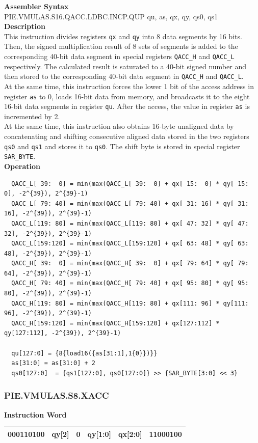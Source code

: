 \textbf{Assembler Syntax} \\
PIE.VMULAS.S16.QACC.LDBC.INCP.QUP qu, as, qx, qy, qs0, qs1 \\
\textbf{Description} \\
This instruction divides registers \lstinline{qx} and \lstinline{qy} into 8 data segments by 16 bits. Then, the signed multiplication result of 8 sets of segments is added to the corresponding 40-bit data segment in special registers \lstinline{QACC_H} and \lstinline{QACC_L} respectively. The calculated result is saturated to a 40-bit signed number and then stored to the corresponding 40-bit data segment in \lstinline{QACC_H} and \lstinline{QACC_L}.\\
At the same time, this instruction forces the lower 1 bit of the access address in register \lstinline{as} to 0, loads 16-bit data from memory, and broadcasts it to the eight 16-bit data segments in register \lstinline{qu}. After the access, the value in register \lstinline{as} is incremented by 2.\\
At the same time, this instruction also obtains 16-byte unaligned data by concatenating and shifting consecutive aligned data stored in the two registers \lstinline{qs0} and \lstinline{qs1} and stores it to \lstinline{qs0}. The shift byte is stored in special register \lstinline{SAR_BYTE}.\\
\textbf{Operation}
\begin{lstlisting}
  QACC_L[ 39:  0] = min(max(QACC_L[ 39:  0] + qx[ 15:  0] * qy[ 15:  0], -2^{39}), 2^{39}-1)
  QACC_L[ 79: 40] = min(max(QACC_L[ 79: 40] + qx[ 31: 16] * qy[ 31: 16], -2^{39}), 2^{39}-1)
  QACC_L[119: 80] = min(max(QACC_L[119: 80] + qx[ 47: 32] * qy[ 47: 32], -2^{39}), 2^{39}-1)
  QACC_L[159:120] = min(max(QACC_L[159:120] + qx[ 63: 48] * qy[ 63: 48], -2^{39}), 2^{39}-1)
  QACC_H[ 39:  0] = min(max(QACC_H[ 39:  0] + qx[ 79: 64] * qy[ 79: 64], -2^{39}), 2^{39}-1)
  QACC_H[ 79: 40] = min(max(QACC_H[ 79: 40] + qx[ 95: 80] * qy[ 95: 80], -2^{39}), 2^{39}-1)
  QACC_H[119: 80] = min(max(QACC_H[119: 80] + qx[111: 96] * qy[111: 96], -2^{39}), 2^{39}-1)
  QACC_H[159:120] = min(max(QACC_H[159:120] + qx[127:112] * qy[127:112], -2^{39}), 2^{39}-1)

  qu[127:0] = {8{load16({as[31:1],1{0}})}}
  as[31:0] = as[31:0] + 2
  qs0[127:0]  = {qs1[127:0], qs0[127:0]} >> {SAR_BYTE[3:0] << 3}
\end{lstlisting}

\newpage
\subsubsection{PIE.VMULAS.S8.XACC}\label{instruction:PIEVMULASS8XACC}
\setlength\tabcolsep{6pt}
\textbf{Instruction Word} \\
\begin{tabular}{|c|c|c|c|c|c|}
	\hline
	000110100 & qy[2] & 0 & qy[1:0] & qx[2:0] & 11000100 \\
	\hline
\end{tabular}

